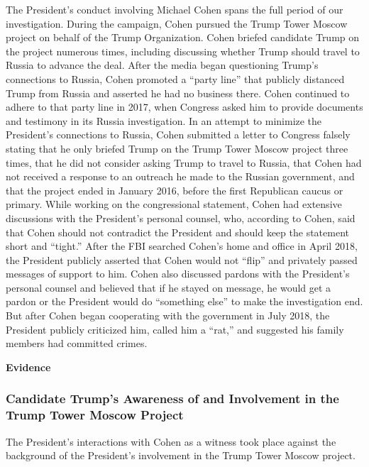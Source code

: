 The President's conduct involving Michael Cohen spans the full period of our investigation.
During the campaign, Cohen pursued the Trump Tower Moscow project on behalf of the Trump Organization.
Cohen briefed candidate Trump on the project numerous times, including discussing whether Trump should travel to Russia to advance the deal.
After the media began questioning Trump's connections to Russia, Cohen promoted a ``party line'' that publicly distanced Trump from Russia and asserted he had no business there.
Cohen continued to adhere to that party line in 2017, when Congress asked him to provide documents and testimony in its Russia investigation.
In an attempt to minimize the President's connections to Russia, Cohen submitted a letter to Congress falsely stating that he only briefed Trump on the Trump Tower Moscow project three times, that he did not consider asking Trump to travel to Russia, that Cohen had not received a response to an outreach he made to the Russian government, and that the project ended in January 2016, before the first Republican caucus or primary.
While working on the congressional statement, Cohen had extensive discussions with the President's personal counsel, who, according to Cohen, said that Cohen should not contradict the President and should keep the statement short and ``tight.''
After the FBI searched Cohen's home and office in April 2018, the President publicly asserted that Cohen would not ``flip'' and privately passed messages of support to him.
Cohen also discussed pardons with the President's personal counsel and believed that if he stayed on message, he would get a pardon or the President would do ``something else'' to make the investigation end.
But after Cohen began cooperating with the government in July 2018, the President publicly criticized him, called him a ``rat,'' and suggested his family members had committed crimes.

\begin{center}
\textbf{Evidence}
\end{center}

\subsubsection{Candidate Trump's Awareness of and Involvement in the Trump Tower Moscow Project}

The President's interactions with Cohen as a witness took place against the background of the President's involvement in the Trump Tower Moscow project.

